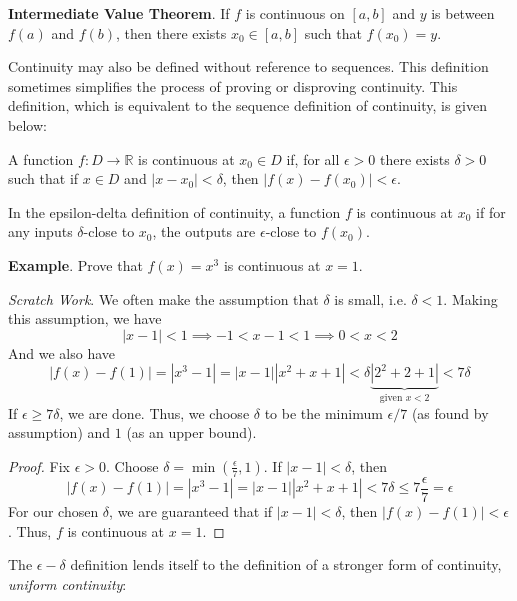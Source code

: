 \textbf{Intermediate Value Theorem}. If $f$ is continuous on $[a,b]$ and $y$ is between $f(a)$ and $f(b)$, then there exists $x_0\in[a,b]$ such that $f(x_0)=y$.

Continuity may also be defined without reference to sequences. This definition sometimes simplifies the process of proving or disproving continuity. This definition, which is equivalent to the sequence definition of continuity, is given below:
\begin{defn}
    A function $f:D\to\mathbb{R}$ is continuous at $x_0\in D$ if, for all $\epsilon>0$ there exists $\delta >0$ such that if $x\in D$ and $|x-x_0|<\delta$, then $|f(x)-f(x_0)| < \epsilon$.
\end{defn}
In the epsilon-delta definition of continuity, a function $f$ is continuous at $x_0$ if for any inputs $\delta$-close to $x_0$, the outputs are $\epsilon$-close to $f(x_0)$.

\textbf{Example}. Prove that $f(x) = x^3$ is continuous at $x=1$.

\textit{Scratch Work}. We often make the assumption that $\delta$ is small, i.e. $\delta<1$. Making this assumption, we have \[|x-1| < 1 \implies -1 < x-1 < 1 \implies 0 < x < 2\] And we also have \[|f(x)-f(1)| = |x^3-1| = |x-1||x^2+x+1|< \delta \underbrace{|2^2+2+1|}_{\text{given }x<2} < 7\delta\] If $\epsilon\geq 7\delta$, we are done. Thus, we choose $\delta$ to be the minimum $\epsilon/7$ (as found by assumption) and $1$ (as an upper bound).

\begin{proof}
    Fix $\epsilon > 0$. Choose $\delta = \min \left(\frac{\epsilon}{7}, 1\right)$. If $|x-1|<\delta$, then \[|f(x)-f(1)| = |x^3 - 1| = |x-1||x^2+x+1| < 7\delta \leq 7\frac{\epsilon}{7} = \epsilon\] For our chosen $\delta$, we are guaranteed that if $|x-1|<\delta$, then $|f(x)-f(1)|<\epsilon$. Thus, $f$ is continuous at $x=1$.
\end{proof}

%
%

The $\epsilon-\delta$ definition lends itself to the definition of a stronger form of continuity, \textit{uniform continuity}:

